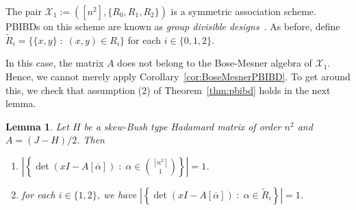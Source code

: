 \documentclass[11pt]{article}
\newtheorem{lemma}[theorem]{Lemma}
\begin{document}
The pair $\mathcal X_1 := ([n^2],\{R_0,R_1,R_2\})$ is a symmetric association scheme. 
PBIBDs on this scheme are known as \emph{group divisible designs}~\cite{gdd1,gdd2}.
As before, define $\tilde{R}_i=\{\{x,y\}  \; : \;  (x,y)\in R_i\}$ for each $i\in\{0,1,2\}$. 

In this case, the matrix $A$ does not belong to the Bose-Mesner algebra of $\mathcal X_1$.
Hence, we cannot merely apply Corollary~\ref{cor:BoseMesnerPBIBD}.
To get around this, we check that assumption (2) of Theorem~\ref{thm:pbibd} holds in the next lemma.

\begin{lemma}\label{lem:skewgdd}
Let $H$ be a skew-Bush type Hadamard matrix of order $n^2$ and $A=(J-H)/2$. 
Then
\begin{enumerate}
    \item $\left | \left \{ \det(xI-A[\overline{\alpha}]) \; : \; \alpha\in \binom{[n^2]}{1} \right \} \right | = 1$.  
\item for each $i \in \{1,2\}$, we have $ \left | \left \{ \det(xI-A[\overline{\alpha}]) \; : \; \alpha\in \tilde{R}_i \right \} \right | = 1$.
\end{enumerate}
\end{lemma}
\end{document}
